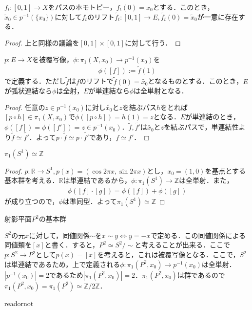 \documentclass[uplatex]{jsarticle}
\begin{document}
\begin{teiri}
  $f_t \colon \left[0,1\right]\to X$をパスのホモトピー，$f_t(0)=x_0$とする．このとき，$\tilde{x}_0 \in p^{-1}(\{x_0\})$に対して$f_t$のリフト$\tilde{f_t}\colon \left[0,1\right]\to E,\tilde{f_t}(0)=\tilde{x}_0$が一意に存在する．
\end{teiri}
\begin{proof}
  上と同様の議論を$\left[0,1\right]\times \left[0,1\right]$に対して行う．
\end{proof}
\begin{teiri}
  $p\colon E\to X$を被覆写像，$\phi\colon \pi_1(X,x_0)\to p^{-1}(x_0)$を
  \begin{align*}
    \phi(\left[f\right]) := \tilde{f}(1)
  \end{align*}
  で定義する．ただし$\tilde{f}$は$f$のリフトで$\tilde{f}(0)=\tilde{x_0}$となるものとする．このとき，$E$が弧状連結なら$\phi$は全射，$E$が単連結なら$\phi$は全単射となる．
\end{teiri}
\begin{proof}
  任意の$z\in p^{-1}(x_0)$に対し$\tilde{x_0}$と$z$を結ぶパス$h$をとれば$\left[p\circ h\right] \in \pi_1(X,x_0)$で$\phi(\left[p\circ h\right]) = h(1) = z$となる．$E$が単連結のとき，$\phi(\left[f\right]) = \phi(\left[f'\right])=z\in p^{-1}(x_0)$．$\tilde{f},\tilde{f'}$は$\tilde{x_0}$と$z$を結ぶパスで，単連結性より$\tilde{f}\simeq \tilde{f'}$．よって$p\cdot \tilde{f} \simeq p\cdot \tilde{f'}$であり，$f\simeq f'$．
\end{proof}
\begin{teiri}
  $\pi_1(S^1) \simeq \mathbb{Z}$
\end{teiri}
\begin{proof}
  $p\colon \mathbb{R}\to S^1 , p(x) = (\cos 2\pi x,\sin 2\pi x)$とし，$x_0=(1,0)$を基点とする基本群を考える．$\mathbb{R}$は単連結であるから，$\phi \colon \pi_1(S^1)\to \mathbb{Z}$は全単射．また，
  \begin{align*}
    \phi(\left[f\right]\cdot \left[g\right]) = \phi(\left[f\right]) + \phi(\left[g\right])
  \end{align*}
  が成り立つので，$\phi$は準同型．よって$\pi_1(S^1)\simeq \mathbb{Z}$
\end{proof}
\begin{midashi}{射影平面$P^2$の基本群}

  $S^2$の元$x$に対して，同値関係$\sim$を$x\sim y \Leftrightarrow y = -x$で定める．この同値関係による同値類を$\left[x\right]$と書く．すると，$P^2 \simeq S^2 \mathbin{/} \sim$と考えることが出来る．ここで$p\colon S^2\to P^2$として$p(x) = \left[x\right]$を考えると，これは被覆写像となる．ここで，$S^2$は単連結であるため，上で定義される$\phi\colon \pi_1(P^2,x_0)\to p^{-1}(x_0)$は全単射．$\left|p^{-1}(x_0)\right| = 2$であるため$\left|\pi_1(P^2,x_0)\right| = 2$．$\pi_1(P^2,x_0)$は群であるので$\pi_1(P^2,x_0) = \pi_1(P^2) \simeq \mathbb{Z}/2\mathbb{Z}$．
\end{midashi}

\expandafter\ifx\csname readornot\endcsname\relax
  
\end{document}
